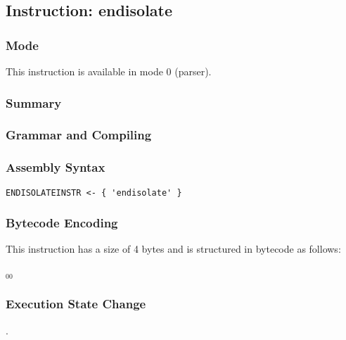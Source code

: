 \subsection{Instruction: endisolate}

\subsubsection{Mode}
This instruction is available in mode 0 (parser).
\subsubsection{Summary}


\subsubsection{Grammar and Compiling}


\subsubsection{Assembly Syntax}

\begin{myquote}
\begin{verbatim}
ENDISOLATEINSTR <- { 'endisolate' }
\end{verbatim}
\end{myquote}

\subsubsection{Bytecode Encoding}

This instruction has a size of 4 bytes and is structured in bytecode as follows:

$_{00}$\ 

\subsubsection{Execution State Change}

.


